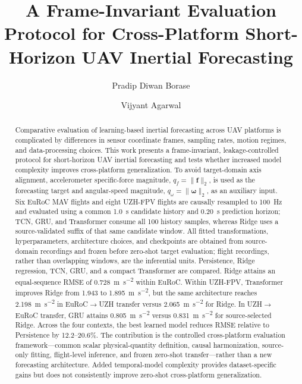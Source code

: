 \documentclass[preprint,12pt]{elsarticle}
\newcommand{\qf}{q_f}
\newcommand{\qw}{q_\omega}
\begin{document}
\begin{frontmatter}

\title{A Frame-Invariant Evaluation Protocol for Cross-Platform Short-Horizon UAV Inertial Forecasting}

\author[aff1]{Pradip Diwan Borase}
\author[aff1]{Vijyant Agarwal}
\address[aff1]{Department of Mechanical Engineering, Netaji Subhas University of Technology, New Delhi, Delhi, India}

\begin{abstract}
Comparative evaluation of learning-based inertial forecasting across UAV platforms is complicated by differences in sensor coordinate frames, sampling rates, motion regimes, and data-processing choices. This work presents a frame-invariant, leakage-controlled protocol for short-horizon UAV inertial forecasting and tests whether increased model complexity improves cross-platform generalization. To avoid target-domain axis alignment, accelerometer specific-force magnitude, $\qf=\lVert\mathbf{f}\rVert_2$, is used as the forecasting target and angular-speed magnitude, $\qw=\lVert\boldsymbol{\omega}\rVert_2$, as an auxiliary input. Six EuRoC MAV flights and eight UZH-FPV flights are causally resampled to 100~Hz and evaluated using a common 1.0~s candidate history and 0.20~s prediction horizon; TCN, GRU, and Transformer consume all 100 history samples, whereas Ridge uses a source-validated suffix of that same candidate window. All fitted transformations, hyperparameters, architecture choices, and checkpoints are obtained from source-domain recordings and frozen before zero-shot target evaluation; flight recordings, rather than overlapping windows, are the inferential units. Persistence, Ridge regression, TCN, GRU, and a compact Transformer are compared. Ridge attains an equal-sequence RMSE of 0.728~\si{\metre\per\second\squared} within EuRoC. Within UZH-FPV, Transformer improves Ridge from 1.943 to 1.895~\si{\metre\per\second\squared}, but the same architecture reaches 2.198~\si{\metre\per\second\squared} in EuRoC$\rightarrow$UZH transfer versus 2.065~\si{\metre\per\second\squared} for Ridge. In UZH$\rightarrow$EuRoC transfer, GRU attains 0.805~\si{\metre\per\second\squared} versus 0.831~\si{\metre\per\second\squared} for source-selected Ridge. Across the four contexts, the best learned model reduces RMSE relative to Persistence by 12.2--20.6\%. The contribution is the controlled cross-platform evaluation framework---common scalar physical-quantity definition, causal harmonization, source-only fitting, flight-level inference, and frozen zero-shot transfer---rather than a new forecasting architecture. Added temporal-model complexity provides dataset-specific gains but does not consistently improve zero-shot cross-platform generalization.
\end{abstract}


\end{frontmatter}
\end{document}
